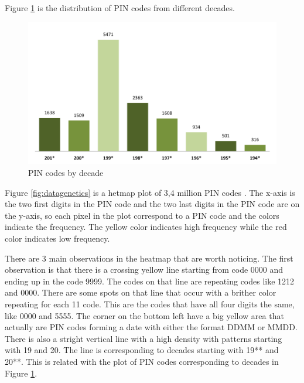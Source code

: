   Figure \ref{fig:pindecades} is the distribution of PIN codes from different decades. 
    
  \begin{figure}[H]
    \centering
    \includegraphics[width=\textwidth]{pics/analysis/pindecades.png}
    \caption{PIN codes by decade}
    \label{fig:pindecades}
  \end{figure}

  Figure \ref{fig:datagenetics} is a hetmap plot of 3,4 million PIN codes \cite{datagenetics}. The x-axis is the two first digits in the PIN code and the two last digits in the PIN code are on the y-axis, so each pixel in the plot correspond to a PIN code and the colors indicate the frequency. The yellow color indicates high frequency while the red color indicates low frequency. 

  There are 3 main observations in the heatmap that are worth noticing. The first observation is that there is a crossing yellow line starting from code 0000 and ending up in the code 9999. The codes on that line are repeating codes like 1212 and 0000. There are some spots on that line that occur with a brither color repeating for each 11 code. This are the codes that have all four digits the same, like 0000 and 5555. The corner on the bottom left have a big yellow area that actually are PIN codes forming a date with either the format DDMM or MMDD. There is also a stright vertical line with a high density with patterns starting with 19 and 20. The line is corresponding to decades starting with 19** and 20**. This is related with the plot of PIN codes corresponding to decades in Figure \ref{fig:pindecades}.

